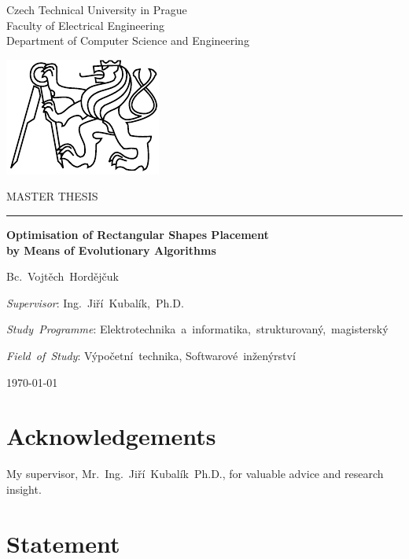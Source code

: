 \documentclass[11pt,twoside,a4paper]{book}
\begin{document}

\cleardoublepage

\begin{center}

{\large Czech Technical University in Prague \\
Faculty of Electrical Engineering \\
Department of Computer Science and Engineering}

\vfill

\includegraphics[width=0.6\paperwidth]{ctu.pdf}

\vfill

{\large MASTER THESIS}

\vfill
\hrule
\vfill

{\LARGE
\bf Optimisation of Rectangular Shapes Placement \\
by Means of Evolutionary Algorithms}

{\LARGE Bc.~Vojtěch~Hordějčuk}

\vfill

{\em Supervisor}: {\small Ing.~Jiří~Kubalík,~Ph.D.}

{\em Study~Programme}: {\small Elektrotechnika~a~informatika,~strukturovaný,~magisterský}

{\em Field~of~Study}: {\small Výpočetní~technika, Softwarové~inženýrství}

\vfill

\today

\end{center}


\cleardoublepage
\vspace*{\fill}

\section*{Acknowledgements}

My supervisor, Mr.~Ing.~Jiří~Kubalík~Ph.D., for valuable advice and research insight.

\section*{Statement}
\end{document}
